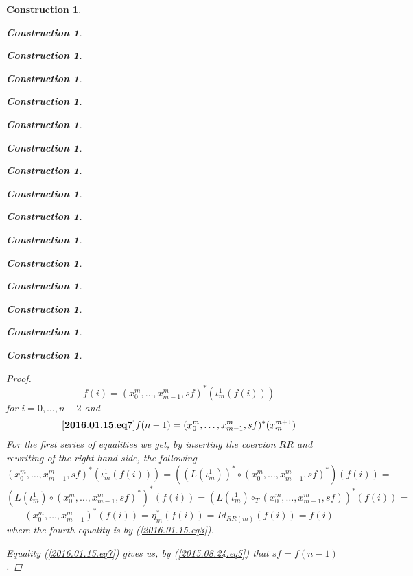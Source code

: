 \documentclass[12pt]{amsart}
\newenvironment{eq}{\begin{equation}}{\end{equation}}
\newtheorem{construction}[proposition]{Construction}
\newcommand{\llabel}[1]{\label{#1}[{\bf #1}]}
\newcommand{\mbind}[1]{{#1^*}}
\newcommand{\hc}{\circ_{T}}
\begin{document}
\begin{construction}
\begin{construction}
\begin{construction}
\begin{construction}
\begin{construction}
\begin{construction}
\begin{construction}
\begin{construction}
\begin{construction}
\begin{construction}
\begin{construction}
\begin{construction}
\begin{construction}
\begin{construction}
\begin{construction}
\begin{construction}
\begin{proof}
\begin{eq}
f(i)=\mbind{(x_0^m,\dots,x_{m-1}^m,sf)}(\iota_m^1(f(i)))
\end{eq}
%
for $i=0,\dots,n-2$ and 
%
\begin{eq}\llabel{2016.01.15.eq7}
f(n-1)=\mbind{(x_0^m,\dots,x_{m-1}^m,sf)}(x_{m}^{m+1})
\end{eq}
%
For the first series of equalities we get, by inserting the coercion $RR$ and rewriting of the right hand side, the following
%
$$\mbind{(x_0^m,\dots,x_{m-1}^m,sf)}(\iota_m^1(f(i)))=(\mbind{(L(\iota_m^1))}\circ \mbind{(x_0^m,\dots,x_{m-1}^m,sf)})(f(i))=$$$$\mbind{(L(\iota_m^1)\circ \mbind{(x_0^m,\dots,x_{m-1}^m,sf)})}(f(i))=\mbind{(L(\iota_m^1)\hc (x_0^m,\dots,x_{m-1}^m,sf))}(f(i))=$$$$\mbind{(x_0^m,\dots,x_{m-1}^m)}(f(i))=\mbind{\eta_{m}}(f(i))=Id_{RR(m)}(f(i))=f(i)$$
%
where the fourth equality is by (\ref{2016.01.15.eq3}). 

Equality (\ref{2016.01.15.eq7}) gives us, by (\ref{2015.08.24.eq5}) that $sf=f(n-1)$.
\end{proof}
%
%


\end{construction}
\end{construction}
\end{construction}
\end{construction}
\end{construction}
\end{construction}
\end{construction}
\end{construction}
\end{construction}
\end{construction}
\end{construction}
\end{construction}
\end{construction}
\end{construction}
\end{construction}
\end{construction}
\end{document}
